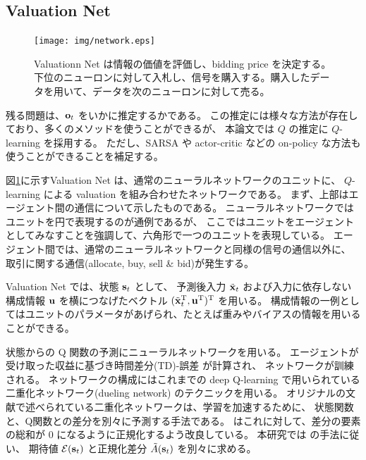 

\subsection{Valuation Net}

\begin{figure}[t]
\centering
\texttt{[image: img/network.eps]}
\caption{
Valuationn Net は情報の価値を評価し、bidding price を決定する。
下位のニューロンに対して入札し、信号を購入する。購入したデータを用いて、データを次のニューロンに対して売る。
}
\label{fig:network}
\end{figure}

残る問題は、$\mathrm{\mathbf{o}}_t$ をいかに推定するかである。
この推定には様々な方法が存在しており、多くのメソッドを使うことができるが、
本論文では $Q$ の推定に $Q$-learning を採用する。
ただし、SARSA や actor-critic などの on-policy な方法も使うことができることを補足する。

図\ref{fig:network}に示すValuation Net は、通常のニューラルネットワークのユニットに、
$Q$-learning による valuation を組み合わせたネットワークである。
まず、上部はエージェント間の通信について示したものである。
ニューラルネットワークではユニットを円で表現するのが通例であるが、
ここではユニットをエージェントとしてみなすことを強調して、六角形で一つのユニットを表現している。
エージェント間では、通常のニューラルネットワークと同様の信号の通信以外に、
取引に関する通信(allocate, buy, sell \& bid)が発生する。

Valuation Net では、状態 $\mathrm{\mathbf{s}}_t$ として、
予測後入力 $\tilde{\mathrm{\mathbf{x}}}_t$ および入力に依存しない構成情報 $\mathrm{\mathbf{u}}$ を横につなげたベクトル $(\tilde{\mathrm{\mathbf{x}}}_t^{\mathrm{T}}, \mathrm{\mathbf{u}}^{\mathrm{T}})^{\mathrm{T}}$ を用いる。
構成情報の一例としてはユニットのパラメータがあげられ、たとえば重みやバイアスの情報を用いることができる。

状態からの Q 関数の予測にニューラルネットワークを用いる。
エージェントが受け取った収益に基づき時間差分(TD)-誤差 が計算され、
ネットワークが訓練される。
ネットワークの構成にはこれまでの deep Q-learning で用いられている二重化ネットワーク(dueling network) \citep{wang2015dueling} のテクニックを用いる。
オリジナルの文献\citep{wang2015dueling}で述べられている二重化ネットワークは、学習を加速するために、
状態関数と、Q関数との差分を別々に予測する手法である。
\cite{dosovitskiy2016learning} はこれに対して、差分の要素の総和が 0 になるように正規化するよう改良している。
本研究では \cite{dosovitskiy2016learning} の手法に従い、
期待値 $\mathcal{E}(\mathrm{\mathbf{s}}_t)$ と正規化差分 $\tilde{A}(\mathrm{\mathbf{s}}_t)$ を別々に求める。

